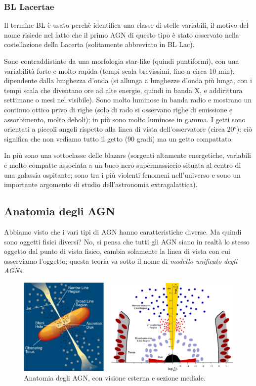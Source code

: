 \subsubsection{BL Lacertae} 
Il termine BL è usato perchè identifica una classe di stelle variabili, il motivo del nome risiede nel fatto che il primo AGN di questo tipo è stato osservato nella costellazione della Lacerta (solitamente abbreviato in BL Lac). 

Sono contraddistinte da una morfologia star-like (quindi puntiformi), con una variabilità forte e molto rapida (tempi scala brevissimi, fino a circa 10 min), dipendente dalla lunghezza d’onda (si allunga a lunghezze d’onda più lunga, con i tempi scala che diventano ore ad alte energie, quindi in banda X, e addirittura settimane o mesi nel visibile). Sono molto luminose in banda radio e mostrano un continuo ottico privo di righe (solo di rado si osservano righe di emissione e assorbimento, molto deboli); in più sono molto luminose in gamma. I getti sono orientati a piccoli angoli rispetto alla linea di vista dell’osservatore (circa 20°): ciò significa che non vediamo tutto il getto (90 gradi) ma un getto compattato.

In più sono una sottoclasse delle blazars (sorgenti altamente energetiche, variabili e molto compatte associata a un buco nero supermassiccio situata al centro di una galassia ospitante; sono tra i più violenti fenomeni nell'universo e sono un importante argomento di studio dell'astronomia extragalattica).

\subsection{Anatomia degli AGN}
Abbiamo visto che i vari tipi di AGN hanno caratteristiche diverse. Ma quindi sono oggetti fisici diversi? No, si pensa che tutti gli AGN siano in realtà lo stesso oggetto dal punto di vista fisico, cambia solamente la linea di vista con cui osserviamo l’oggetto; questa teoria va sotto il nome di \emph{modello unificato degli AGNs}.

\begin{figure}
    \centering
    \includegraphics[width = \textwidth]{immagini/sezione-e-anatomia-agn.png}
    \caption{Anatomia degli AGN, con visione esterna e sezione mediale.}
    \label{fig:sezione-e-anatomia-agn}
\end{figure}

